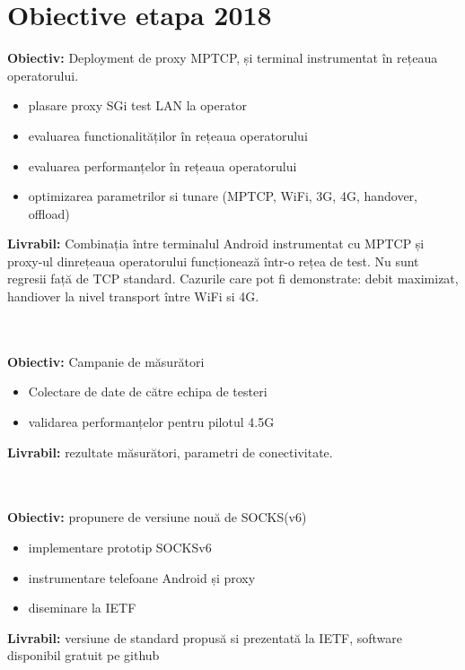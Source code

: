 \section{Obiective etapa 2018}
\label{sec:objectives}


{\bf Obiectiv:} Deployment de proxy MPTCP, și terminal instrumentat în rețeaua operatorului. 
\begin{itemize}
\item plasare proxy SGi test LAN la operator
\item evaluarea functionalităților în rețeaua operatorului
\item evaluarea performanțelor în rețeaua operatorului
\item optimizarea parametrilor si tunare (MPTCP, WiFi, 3G, 4G, handover,
offload)
\end{itemize}

{\bf Livrabil:} Combinația între terminalul Android instrumentat cu MPTCP și
proxy-ul dinrețeaua operatorului funcționează într-o rețea de test. Nu
sunt regresii față de TCP standard. Cazurile care pot fi demonstrate:
debit maximizat, handiover la nivel transport între WiFi si 4G. 

~\\
~\\

{\bf Obiectiv:} Campanie de măsurători
\begin{itemize}
\item Colectare de date de către echipa de testeri
\item validarea performanțelor pentru pilotul 4.5G 
\end{itemize}

{\bf Livrabil:} rezultate măsurători, parametri de conectivitate. 

~\\
~\\

{\bf Obiectiv:} propunere de versiune nouă de SOCKS(v6)
\begin{itemize} 
\item implementare prototip SOCKSv6
\item instrumentare telefoane Android și proxy
\item diseminare la IETF
\end{itemize}

{\bf Livrabil:} versiune de standard propusă si prezentată la IETF, software disponibil gratuit pe github
